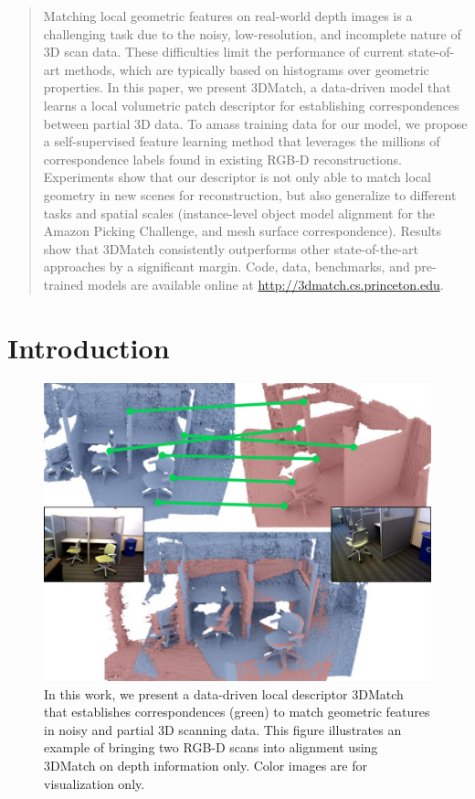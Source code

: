 \documentclass[10pt,twocolumn,letterpaper]{article}
\begin{document}
\begin{abstract}
Matching local geometric features on real-world depth images is a challenging task due to the noisy, low-resolution, and incomplete nature of 3D scan data. These difficulties limit the performance of current state-of-art methods, which are typically based on histograms over geometric properties. In this paper, we present 3DMatch, a data-driven model that learns a local volumetric patch descriptor for establishing correspondences between partial 3D data. To amass training data for our model, we propose a self-supervised feature learning method that leverages the millions of correspondence labels found in existing RGB-D reconstructions. Experiments show that our descriptor is not only able to match local geometry in new scenes for reconstruction, but also generalize to different tasks and spatial scales (\eg instance-level object model alignment for the Amazon Picking Challenge, and mesh surface correspondence). Results show that 3DMatch consistently outperforms other state-of-the-art approaches by a significant margin. Code, data, benchmarks, and pre-trained models are available online at \href{http://3dmatch.cs.princeton.edu/}{http://3dmatch.cs.princeton.edu}.




\end{abstract}

\section{Introduction}


\begin{figure}[t]

\includegraphics[width=1\linewidth]{images/teaser.jpg}
\caption{In this work, we present a data-driven local descriptor 3DMatch that establishes correspondences (green) to match geometric features in noisy and partial 3D scanning data. This figure illustrates an example of bringing two RGB-D scans into alignment using 3DMatch on depth information only. Color images are for visualization only.}
\label{fig:teaser}
\end{figure}
\end{document}
